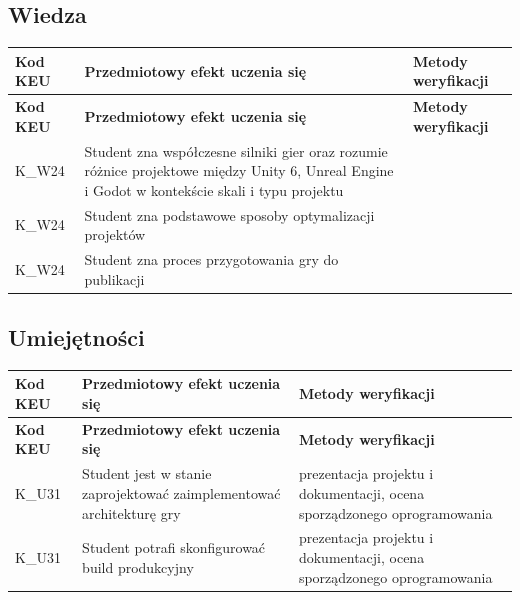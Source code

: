 \documentclass[12pt, a4paper]{article}
\newcommand{\thdrule}{\noalign{\global\setlength{\extrarowheight}{0pt}}}
\newcommand{\thdend}{\noalign{\global\setlength{\extrarowheight}{3pt}}}
\begin{document}
\subsection*{Wiedza}
{\scriptsize
\begin{longtable}{m{1.6cm}m{9.0cm}m{4.2cm}}
\thdrule\toprule
\rowcolor{pjatkRed} {\color{white}\footnotesize\textbf{\vphantom{Ag}Kod KEU}} & {\color{white}\footnotesize\textbf{\vphantom{Ag}Przedmiotowy efekt uczenia się}} & {\color{white}\footnotesize\textbf{\vphantom{Ag}Metody weryfikacji}} \\
\midrule\thdend
\endfirsthead
\thdrule\toprule
\rowcolor{pjatkRed} {\color{white}\footnotesize\textbf{\vphantom{Ag}Kod KEU}} & {\color{white}\footnotesize\textbf{\vphantom{Ag}Przedmiotowy efekt uczenia się}} & {\color{white}\footnotesize\textbf{\vphantom{Ag}Metody weryfikacji}} \\
\midrule\thdend
\endhead
  \rowcolor{tableRowLight} K\_W24 & Student zna współczesne silniki gier oraz rozumie różnice projektowe między Unity 6, Unreal Engine i Godot w kontekście skali i typu projektu &  \\
  \rowcolor{tableRowAlt} K\_W24 & Student zna podstawowe sposoby optymalizacji projektów &  \\
  \rowcolor{tableRowLight} K\_W24 & Student zna proces przygotowania gry do publikacji &  \\
\bottomrule
\end{longtable}}

\subsection*{Umiejętności}
{\scriptsize
\begin{longtable}{m{1.6cm}m{9.0cm}m{4.2cm}}
\thdrule\toprule
\rowcolor{pjatkRed} {\color{white}\footnotesize\textbf{\vphantom{Ag}Kod KEU}} & {\color{white}\footnotesize\textbf{\vphantom{Ag}Przedmiotowy efekt uczenia się}} & {\color{white}\footnotesize\textbf{\vphantom{Ag}Metody weryfikacji}} \\
\midrule\thdend
\endfirsthead
\thdrule\toprule
\rowcolor{pjatkRed} {\color{white}\footnotesize\textbf{\vphantom{Ag}Kod KEU}} & {\color{white}\footnotesize\textbf{\vphantom{Ag}Przedmiotowy efekt uczenia się}} & {\color{white}\footnotesize\textbf{\vphantom{Ag}Metody weryfikacji}} \\
\midrule\thdend
\endhead
  \rowcolor{tableRowLight} K\_U31 & Student jest w stanie zaprojektować zaimplementować architekturę gry & prezentacja projektu i dokumentacji, ocena sporządzonego oprogramowania \\
  \rowcolor{tableRowAlt} K\_U31 & Student potrafi skonfigurować build produkcyjny & prezentacja projektu i dokumentacji, ocena sporządzonego oprogramowania \\
\bottomrule
\end{longtable}}
\end{document}
